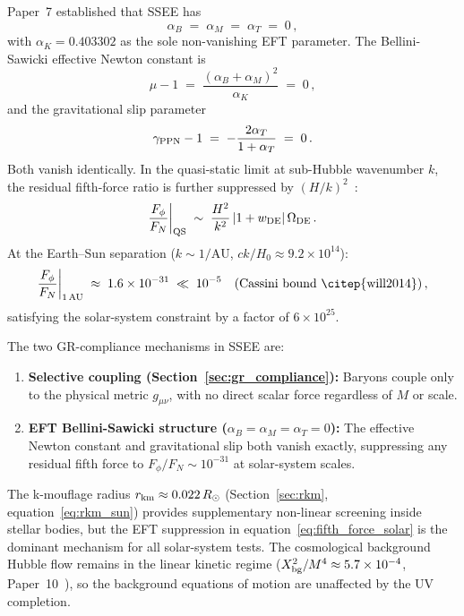 \documentclass[12pt,a4paper]{article}
\begin{document}
Paper~7 established that SSEE has~\citep{ssee_paper7}
\begin{equation}
  \alpha_B \;=\; \alpha_M \;=\; \alpha_T \;=\; 0\,,
  \label{eq:bs_zero}
\end{equation}
with $\alpha_K = 0.403302$ as the sole non-vanishing EFT parameter.
The Bellini-Sawicki effective Newton constant is~\citep{Bellini2015}
\begin{equation}
  \mu - 1 \;=\; \frac{(\alpha_B + \alpha_M)^2}{\alpha_K} \;=\; 0\,,
  \label{eq:mu_eft}
\end{equation}
and the gravitational slip parameter
\begin{equation}
  \gamma_{\rm PPN} - 1 \;=\; -\frac{2\alpha_T}{1+\alpha_T} \;=\; 0\,.
  \label{eq:gamma_eft}
\end{equation}
Both vanish identically.
In the quasi-static limit at sub-Hubble wavenumber $k$, the residual fifth-force
ratio is further suppressed by $(H/k)^2$~\citep{Bellini2015}:
\begin{equation}
  \frac{F_\phi}{F_N}\bigg|_{\rm QS}
    \;\sim\; \frac{H^2}{k^2}\,|1+w_{\rm DE}|\,\Omega_{\rm DE}\,.
  \label{eq:fifth_force_qs}
\end{equation}
At the Earth--Sun separation ($k \sim 1/\mathrm{AU}$, $ck/H_0 \approx 9.2\times10^{14}$):
\begin{equation}
  \frac{F_\phi}{F_N}\bigg|_{\rm 1\,AU}
    \;\approx\; 1.6\times10^{-31}
    \;\ll\; 10^{-5}\quad(\text{Cassini bound \citep{will2014}})\,,
  \label{eq:fifth_force_solar}
\end{equation}
satisfying the solar-system constraint by a factor of $6\times10^{25}$.

The two GR-compliance mechanisms in SSEE are:
\begin{enumerate}
  \item \textbf{Selective coupling (Section~\ref{sec:gr_compliance}):}
        Baryons couple only to the physical metric $g_{\mu\nu}$, with no direct
        scalar force regardless of $M$ or scale.

  \item \textbf{EFT Bellini-Sawicki structure ($\alpha_B=\alpha_M=\alpha_T=0$):}
        The effective Newton constant and gravitational slip both vanish exactly,
        suppressing any residual fifth force to $F_\phi/F_N \sim 10^{-31}$
        at solar-system scales.
\end{enumerate}

The k-mouflage radius $r_{\rm km} \approx 0.022\,R_\odot$
(Section~\ref{sec:rkm}, equation~\eqref{eq:rkm_sun}) provides supplementary
non-linear screening inside stellar bodies, but the EFT suppression in
equation~\eqref{eq:fifth_force_solar} is the dominant mechanism for all
solar-system tests.
The cosmological background Hubble flow remains in the linear kinetic regime
($X_{\rm bg}^2/M^4 \approx 5.7\times10^{-4}$, Paper~10~\citep{SSEE10}),
so the background equations of motion are unaffected by the UV completion.
\end{document}

